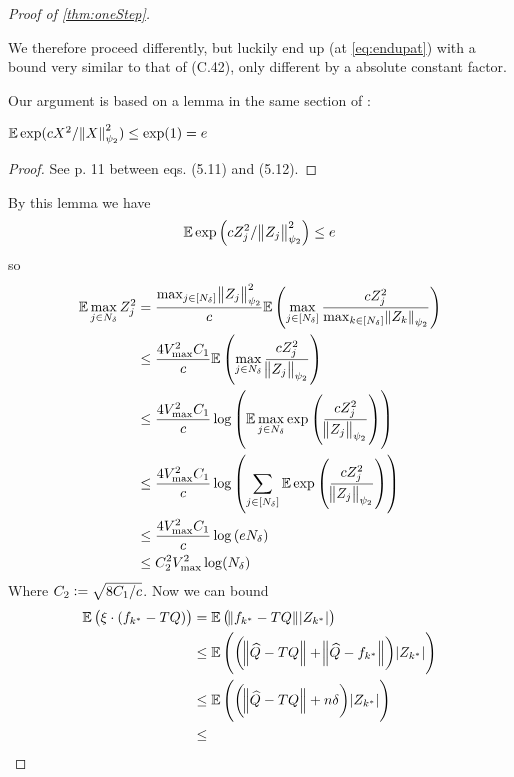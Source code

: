 \begin{proof}[Proof of \cref{thm:oneStep}]
\begin{rem}
    We therefore proceed differently, but luckily end up (at \cref{eq:endupat})
    with a bound very similar to that of  (C.42),
    only different by a absolute constant factor.
    \label{rem:mistake1}
  \end{rem}
  Our argument is based on a lemma in the same section of :
  \begin{lem}
    $\mathbb{E} \exp(c X^2 / \norm{X}_{\psi_2}^2) \leq \exp(1) = e$
  \end{lem}
  \begin{proof}
    See  p. 11 between eqs. (5.11) and (5.12).
  \end{proof}
  By this lemma we have
  \begin{equation}
    \mathbb{E} \exp \left(c Z_j^2/\norm{Z_j}_{\psi_2}^2 \right) \leq e
  \end{equation}
  so
  \begin{align}
    \mathbb{E} \max_{j \in N_\delta} Z_j^2
    = &\; \frac{\max_{j \in [N_\delta]} \norm{Z_j}_{\psi_2}^2}{c}
    \mathbb{E} \left( \max_{j \in [N_\delta]} \frac{  c Z_j^2 } 
    {\max_{k \in [N_\delta]} \norm{Z_k}_{\psi_2}} \right)
    \\ \leq &\; \frac{4 V_{\max}^2 C_1}{c}
    \mathbb{E} \left( \max_{j \in N_\delta} \frac{  c Z_j^2 } 
    {\norm{Z_j}_{\psi_2}} \right)
    \\ \leq &\; \frac{4 V_{\max}^2 C_1}{c}
    \log \left( \mathbb{E} \max_{j \in N_\delta} \exp \left( \frac{  c Z_j^2 } 
    {\norm{Z_j}_{\psi_2}} \right) \right)
    \\ \leq &\; \frac{4 V_{\max}^2 C_1}{c}
    \log \left( \sum_{j \in [N_\delta]} \mathbb{E} \exp \left( \frac{  c Z_j^2 } 
    {\norm{Z_j}_{\psi_2}} \right) \right)
    \\ \leq &\; \frac{4 V_{\max}^2 C_1}{c}
    \log \left( e N_\delta \right)
    \\ \leq &\; C_2^2 V_{\max}^2 \log(N_\delta)
    \label{eq:endupat}
  \end{align}
  Where $C_2 \vcentcolon= \sqrt{8 C_1/c}$.
  Now we can bound
  \begin{align}
    \E \left( \xi \cdot (f_{k^*} - TQ) \right)
    &= \E \left( \norm{f_{k^*} - TQ} \abs{Z_{k^*}} \right)
    \label{eq:long1_1}
    \\ &\leq 
    \E \left( \left(\norm{\wh{Q} - TQ} + \norm{\wh{Q} - f_{k^*}} \right)
    \abs{Z_{k^*}} \right) 
    \label{eq:long1_2}
    \\ &\leq 
    \E \left( \left(\norm{\wh{Q} - TQ} + n \delta \right)
    \abs{Z_{k^*}} \right) 
    \label{eq:long1_3}
    \\ &\leq 

\end{align}
\end{proof}
